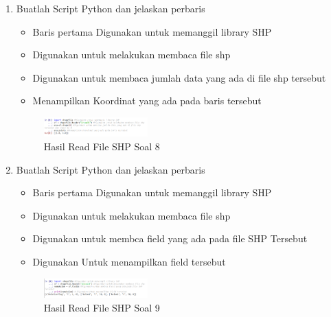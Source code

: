 \begin{enumerate}
    \item Buatlah Script Python dan jelaskan perbaris
    
    \hfill\break
     \begin{itemize}
        \item Baris pertama Digunakan untuk memanggil library SHP
        \item Digunakan untuk melakukan membaca file shp
        \item Digunakan untuk membaca jumlah data yang ada di file shp tersebut
        \item Menampilkan Koordinat yang ada pada baris tersebut
    \end{itemize}  
    \hfill\break
    \begin{figure}[H]
		\includegraphics[width=4cm]{figures/1174021/3/soal8.PNG}
		\centering
		\caption{Hasil Read File SHP Soal 8}
    \end{figure}

    \item Buatlah Script Python dan jelaskan perbaris
    
    \hfill\break
    \begin{itemize}
        \item Baris pertama Digunakan untuk memanggil library SHP
        \item Digunakan untuk melakukan membaca file shp
        \item Digunakan untuk membca field yang ada pada file SHP Tersebut
        \item Digunakan Untuk menampilkan field tersebut
    \end{itemize}  
    \hfill\break
    \begin{figure}[H]
		\includegraphics[width=4cm]{figures/1174021/3/soal9.PNG}
		\centering
		\caption{Hasil Read File SHP Soal 9}
    \end{figure}


\end{enumerate}
